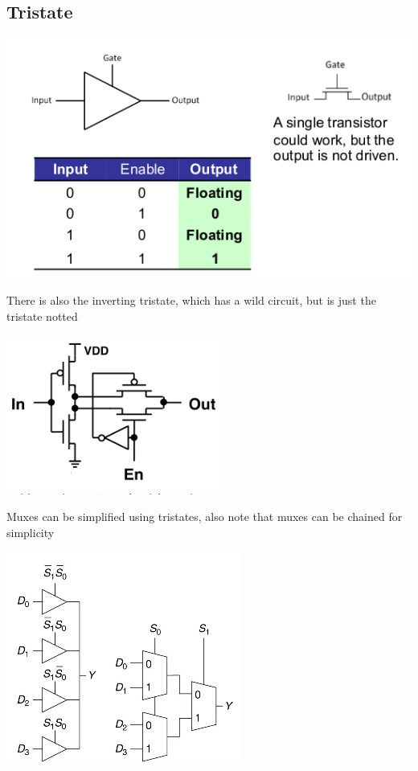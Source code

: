\documentclass{article}[18pt]
\begin{document}
\subsection{Tristate}
\begin{center}
	\includegraphics[scale=0.7]{Tristate}
\end{center}
There is also the inverting tristate, which has a wild circuit, but is just the tristate notted
\begin{center}
	\includegraphics[scale=0.7]{"Inverting Tristate"}
\end{center}
Muxes can be simplified using tristates, also note that muxes can be chained for simplicity
\begin{center}
	\includegraphics[scale=0.7]{Mux1}
\end{center}
\end{document}

